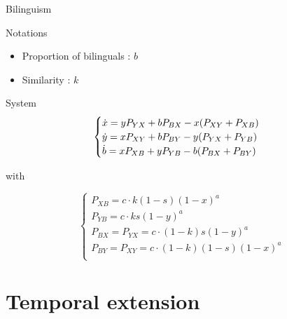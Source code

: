 \documentclass[10pt]{beamer}
\begin{document}
\begin{frame}{Bilinguism}

\begin{alertblock}{Notations}
\begin{itemize}
\item Proportion of bilinguals : $b$
\item Similarity : $k$
\end{itemize}
\end{alertblock}

\begin{exampleblock}{System}
\begin{equation}
\label{eq:bil}
\begin{cases}
\dot{x} = yP_{YX} + bP_{BX} - x(P_{XY} + P_{XB}) \\
\dot{y} = xP_{XY} + bP_{BY} - y(P_{YX} + P_{YB}) \\
\dot{b} = xP_{XB} + yP_{YB} - b(P_{BX} + P_{BY}) \\
\end{cases}
\end{equation}

with

\[
\begin{cases}
P_{XB} = c \cdot k (1-s) (1-x)^a \\
P_{YB} = c \cdot k s (1-y)^a \\
P_{BX} = P_{YX} = c \cdot (1-k) s (1-y)^a \\
P_{BY} = P_{XY} = c \cdot (1-k) (1-s) (1-x)^a \\
\end{cases}
\]
\end{exampleblock}

\end{frame}

\section{Temporal extension}
\end{document}
